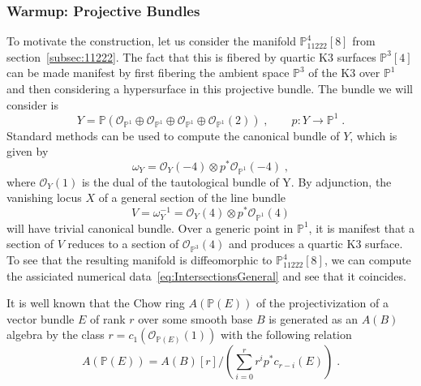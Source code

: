 \documentclass[11pt,a4paper]{article}
\numberwithin{equation}{section}
\numberwithin{table}{section}\setlength{\multlinegap}{25pt}
\begin{document}
\subsubsection*{Warmup: Projective Bundles}
To motivate the construction, let us consider the manifold $\mathbb{P}^4_{11222}[8]$ from section~\ref{subsec:11222}. The fact that this is fibered by quartic K3 surfaces $\mathbb{P}^3[4]$ can be made manifest by first fibering the ambient space $\mathbb{P}^3$ of the K3 over $\mathbb{P}^1$ and then considering a hypersurface in this projective bundle. The bundle we will consider is
\begin{equation}
    Y=\mathbb{P}\left(\mathcal{O}_{\mathbb{P}^1}\oplus\mathcal{O}_{\mathbb{P}^1}\oplus\mathcal{O}_{\mathbb{P}^1}\oplus\mathcal{O}_{\mathbb{P}^1}(2)\right)\;,\qquad p:Y\to\mathbb{P}^1\;.
\end{equation}
Standard methods can be used to compute the canonical bundle of $Y$, which is given by
\begin{equation}
    \omega_Y=\mathcal{O}_Y(-4)\otimes p^* \mathcal{O}_{\mathbb{P}^1}(-4)\;,
\end{equation}
where $\mathcal{O}_Y(1)$ is the dual of the tautological bundle of Y. By adjunction, the vanishing locus $X$ of a general section of the line bundle
\begin{equation}
    \label{eq:Degree4VectorBundle}
    V = \omega_Y^{-1} = \mathcal{O}_Y(4)\otimes p^* \mathcal{O}_{\mathbb{P}^1}(4)
\end{equation}
will have trivial canonical bundle. Over a generic point in $\mathbb{P}^1$, it is manifest that a section of $V$ reduces to a section of $\mathcal{O}_{\mathbb{P}^3}(4)$ and produces a quartic K3 surface. To see that the resulting manifold is diffeomorphic to $\mathbb{P}^4_{11222}[8]$, we can compute the assiciated numerical data~\ref{eq:IntersectionsGeneral} and see that it coincides.

It is well known that the Chow ring $A(\mathbb{P}(E))$ of the projectivization of a vector bundle $E$ of rank $r$ over some smooth base $B$ is generated as an $A(B)$ algebra by the class $r=c_1(\mathcal{O}_{\mathbb{P}(E)}(1))$ with the following relation~\cite{eisenbud_harris_2016}
\begin{equation}
    \label{eq:ChowRingProjectiveBundle}
    A(\mathbb{P}(E))=A(B)[r]\Big/\left(\sum_{i=0}^{r}r^ip^*c_{r-i}(E)\right)\;.
\end{equation}
\end{document}
